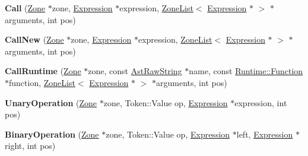 \begin{DoxyCompactItemize}
\item 
\hypertarget{classv8_1_1internal_1_1_v8___f_i_n_a_l_acf38c74e37bdb51944d3247e1fcb3f73}{}{\bfseries Call} (\hyperlink{classv8_1_1internal_1_1_zone}{Zone} $\ast$zone, \hyperlink{classv8_1_1internal_1_1_expression}{Expression} $\ast$expression, \hyperlink{classv8_1_1internal_1_1_zone_list}{Zone\+List}$<$ \hyperlink{classv8_1_1internal_1_1_expression}{Expression} $\ast$ $>$ $\ast$arguments, int pos)\label{classv8_1_1internal_1_1_v8___f_i_n_a_l_acf38c74e37bdb51944d3247e1fcb3f73}

\item 
\hypertarget{classv8_1_1internal_1_1_v8___f_i_n_a_l_a46f40742b6971bc679e9e86c1d802835}{}{\bfseries Call\+New} (\hyperlink{classv8_1_1internal_1_1_zone}{Zone} $\ast$zone, \hyperlink{classv8_1_1internal_1_1_expression}{Expression} $\ast$expression, \hyperlink{classv8_1_1internal_1_1_zone_list}{Zone\+List}$<$ \hyperlink{classv8_1_1internal_1_1_expression}{Expression} $\ast$ $>$ $\ast$arguments, int pos)\label{classv8_1_1internal_1_1_v8___f_i_n_a_l_a46f40742b6971bc679e9e86c1d802835}

\item 
\hypertarget{classv8_1_1internal_1_1_v8___f_i_n_a_l_a1b6acbd8e7a730d9574529696f7c1cf6}{}{\bfseries Call\+Runtime} (\hyperlink{classv8_1_1internal_1_1_zone}{Zone} $\ast$zone, const \hyperlink{classv8_1_1internal_1_1_ast_raw_string}{Ast\+Raw\+String} $\ast$name, const \hyperlink{structv8_1_1internal_1_1_runtime_1_1_function}{Runtime\+::\+Function} $\ast$function, \hyperlink{classv8_1_1internal_1_1_zone_list}{Zone\+List}$<$ \hyperlink{classv8_1_1internal_1_1_expression}{Expression} $\ast$ $>$ $\ast$arguments, int pos)\label{classv8_1_1internal_1_1_v8___f_i_n_a_l_a1b6acbd8e7a730d9574529696f7c1cf6}

\item 
\hypertarget{classv8_1_1internal_1_1_v8___f_i_n_a_l_a81c00aa2b6584c7b21c429d4391ceadb}{}{\bfseries Unary\+Operation} (\hyperlink{classv8_1_1internal_1_1_zone}{Zone} $\ast$zone, Token\+::\+Value op, \hyperlink{classv8_1_1internal_1_1_expression}{Expression} $\ast$expression, int pos)\label{classv8_1_1internal_1_1_v8___f_i_n_a_l_a81c00aa2b6584c7b21c429d4391ceadb}

\item 
\hypertarget{classv8_1_1internal_1_1_v8___f_i_n_a_l_a88ce5f0b3bf252c55cbb686638edcd80}{}{\bfseries Binary\+Operation} (\hyperlink{classv8_1_1internal_1_1_zone}{Zone} $\ast$zone, Token\+::\+Value op, \hyperlink{classv8_1_1internal_1_1_expression}{Expression} $\ast$left, \hyperlink{classv8_1_1internal_1_1_expression}{Expression} $\ast$right, int pos)\label{classv8_1_1internal_1_1_v8___f_i_n_a_l_a88ce5f0b3bf252c55cbb686638edcd80}


\end{DoxyCompactItemize}
